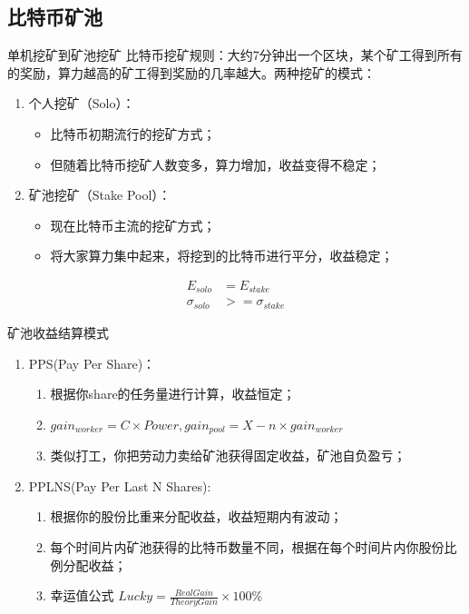\documentclass[11pt]{beamer}
\begin{document}
\subsection{比特币矿池}
\begin{frame}{单机挖矿到矿池挖矿}
	比特币挖矿规则：大约7分钟出一个区块，某个矿工得到所有的奖励，算力越高的矿工得到奖励的几率越大。两种挖矿的模式：
	\begin{enumerate}
		\item 个人挖矿（Solo）：
			\begin{itemize}
				\item 比特币初期流行的挖矿方式；
				\item 但随着比特币挖矿人数变多，算力增加，收益变得不稳定；
			\end{itemize}
		\item 矿池挖矿（Stake Pool）：
			\begin{itemize}
				\item 现在比特币主流的挖矿方式；
				\item 将大家算力集中起来，将挖到的比特币进行平分，收益稳定；
			\end{itemize}
	\end{enumerate}
	\begin{align}
		E_{solo}&=E_{stake}\\
	\sigma_{solo}&>=\sigma_{stake}
	\end{align}	
\end{frame}

\begin{frame}{矿池收益结算模式}
	\begin{enumerate}
		\item  PPS(Pay Per Share)：
		\begin{enumerate}
			\item 根据你share的任务量进行计算，收益恒定；
			\item $gain_{worker}=C\times Power,gain_{pool}=X-n\times gain_{worker}$
			\item 类似打工，你把劳动力卖给矿池获得固定收益，矿池自负盈亏；
		\end{enumerate}
		\item PPLNS(Pay Per Last N Shares):
		\begin{enumerate}
			\item 根据你的股份比重来分配收益，收益短期内有波动；
			\item 每个时间片内矿池获得的比特币数量不同，根据在每个时间片内你股份比例分配收益；
			\item 幸运值公式 $Lucky = \frac{RealGain}{TheoryGain}\times 100 \%$ 
		\end{enumerate}
	\end{enumerate}
\end{frame}
\end{document}
